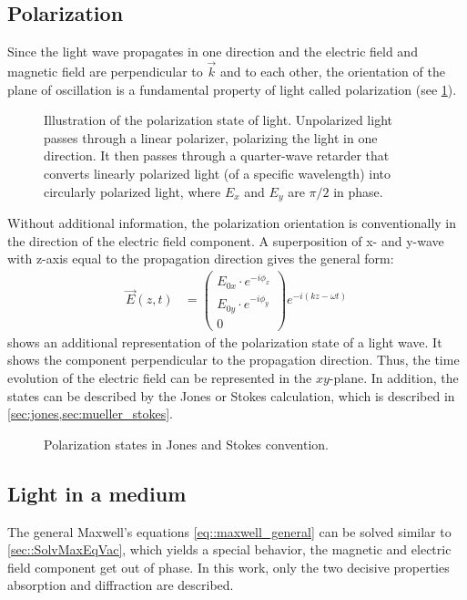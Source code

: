 \subsection{Polarization}\label{sec:polarization}
%
Since the light wave propagates in one direction and the electric field and magnetic field are perpendicular to $\vec{k}$ and to each other, the orientation of the plane of oscillation is a fundamental property of light called polarization (see \cref{fig:polarization_state}).
%
\begin{figure}[!t]
\centering
\setlength{\tikzwidth}{\textwidth}
\caption{Illustration of the polarization state of light. Unpolarized light passes through a linear polarizer, polarizing the light in one direction. It then passes through a quarter-wave retarder that converts linearly polarized light (of a specific wavelength) into circularly polarized light, where $E_x$ and $E_y$ are $\pi/2$ in phase.}
\label{fig:polarization_state}
\end{figure}
% 
Without additional information, the polarization orientation is conventionally in the direction of the electric field component.
A superposition of x- and y-wave with z-axis equal to the propagation direction gives the general form:
% 
\begin{align}
    \vec{E}(z,t) &= \begin{pmatrix} E_{0x} \cdot e^{ -i \phi_x } \\ E_{0y} \cdot e^{ -i \phi_y } \\ 0 \end{pmatrix}
e^{ -i (kz - \omega t)}
\end{align}
%
 shows an additional representation of the polarization state of a light wave.
It shows the component perpendicular to the propagation direction.
Thus, the time evolution of the electric field can be represented in the $xy$-plane.
In addition, the states can be described by the Jones or Stokes calculation, which is described in \cref{sec:jones,sec:mueller_stokes}.
%
\begin{figure}[!t]
\centering

\caption{Polarization states in Jones and Stokes convention.}
\label{fig:polarization_state_vectors}
\end{figure}
%
%
%
\subsection{Light in a medium}
%
The general Maxwell's equations \cref{eq::maxwell_general} can be solved similar to \cref{sec::SolvMaxEqVac}, which yields a special behavior, \eg{} the magnetic and electric field component get out of phase.
In this work, only the two decisive properties absorption and diffraction are described.
% 
% 
%
